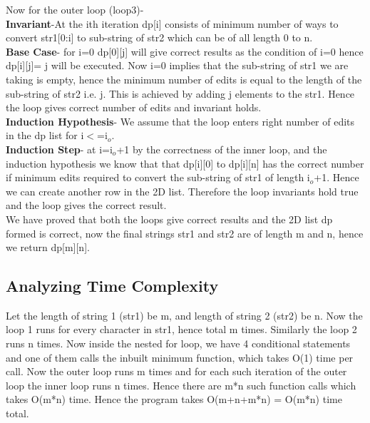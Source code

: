 \documentclass{article}
\begin{document}
Now for the outer loop (loop3)-\\
\textbf{Invariant}-At the ith iteration dp[i] consists of minimum number of ways to convert str1[0:i] to sub-string of str2 which can be of all length 0 to n.\\
\textbf{Base Case}- for i=0 dp[0][j] will give correct results as the condition of i=0 hence dp[i][j]= j will be executed. Now i=0 implies that the sub-string of str1 we are taking is empty, hence the minimum number of edits is equal to the length of the sub-string of str2 i.e. j. This is achieved by adding j elements to the str1. Hence the loop gives correct number of edits and invariant holds.\\
\textbf{Induction Hypothesis}- We assume that the loop enters right number of edits in the dp list for i$<$=i$_o$. \\
\textbf{Induction Step}- at i=i$_o$+1 by the correctness of the inner loop, and the induction hypothesis we know that that dp[i][0] to dp[i][n] has the correct number if minimum edits required to convert the sub-string of str1 of length i$_o$+1. Hence we can create another row in the 2D list. Therefore the loop invariants hold true and the loop gives the correct result.\\
We have proved that both the loops give correct results and the 2D list dp formed is correct, now the final strings str1 and str2 are of length m and n, hence we return dp[m][n].


\subsection{Analyzing Time Complexity}
Let the length of string 1 (str1) be m, and length of string 2 (str2) be n. Now the loop 1 runs for every character in str1, hence total m times. Similarly the loop 2 runs n times. Now inside the nested for loop, we have 4 conditional statements and one of them calls the inbuilt minimum function, which takes O(1) time per call. Now the outer loop runs m times and for each such iteration of the outer loop the inner loop runs n times. Hence there are m*n such function calls which takes O(m*n) time. Hence the program takes O(m+n+m*n) = O(m*n) time total.
\end{document}
